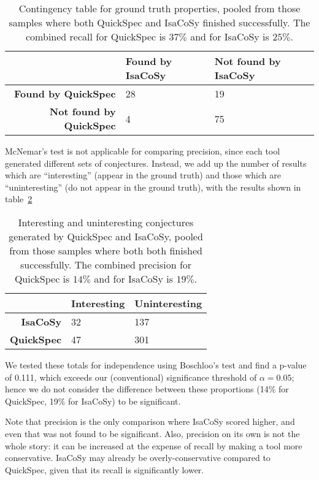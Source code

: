 \begin{table}
  \centering
  \begin{tabular}{ |r|l|l| }
    \hline
    & \bfseries Found by IsaCoSy & \bfseries Not found by IsaCoSy \\
    \hline
    \bfseries Found by QuickSpec     & 28 & 19 \\
    \hline
    \bfseries Not found by QuickSpec & 4  & 75 \\
    \hline
  \end{tabular}
  \caption{Contingency table for ground truth properties, pooled from those
    samples where both QuickSpec and IsaCoSy finished successfully. The combined
    recall for QuickSpec is $37\%$ and for IsaCoSy is $25\%$.}
  \label{table:recall}
\end{table}

McNemar's test is not applicable for comparing precision, since each tool
generated different sets of conjectures. Instead, we add up the number of
results which are ``interesting'' (appear in the ground truth) and those which
are ``uninteresting'' (do not appear in the ground truth), with the results
shown in table~\ref{table:precision}

\begin{table}
  \centering
  \begin{tabular}{ |r|l|l| }
    \hline
              & \bfseries Interesting & \bfseries Uninteresting \\
    \hline
    \bfseries IsaCoSy   & 32          & 137      \\
    \hline
    \bfseries QuickSpec & 47          & 301      \\
    \hline
  \end{tabular}
  \caption{Interesting and uninteresting conjectures generated by QuickSpec and
    IsaCoSy, pooled from those samples where both both finished successfully.
    The combined precision for QuickSpec is $14\%$ and for IsaCoSy is $19\%$.}
  \label{table:precision}
\end{table}

We tested these totals for independence using Boschloo's test and find a p-value
of 0.111, which exceeds our (conventional) significance threshold of
$\alpha = 0.05$; hence we do not consider the difference between these
proportions (14\% for QuickSpec, 19\% for IsaCoSy) to be significant.

Note that precision is the only comparison where IsaCoSy scored higher, and even
that was not found to be significant. Also, precision on its own is not the
whole story: it can be increased at the expense of recall by making a tool more
conservative. IsaCoSy may already be overly-conservative compared to QuickSpec,
given that its recall is significantly lower.

